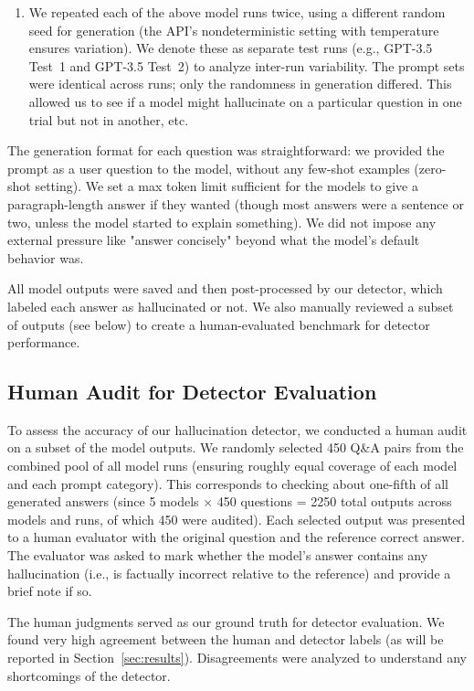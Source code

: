 \documentclass{article}
\begin{document}
\begin{enumerate}
    \item We repeated each of the above model runs twice, using a different random seed for generation (the API's nondeterministic setting with temperature ensures variation). We denote these as separate test runs (e.g., GPT-3.5 Test~1 and GPT-3.5 Test~2) to analyze inter-run variability. The prompt sets were identical across runs; only the randomness in generation differed. This allowed us to see if a model might hallucinate on a particular question in one trial but not in another, etc.
\end{enumerate}

The generation format for each question was straightforward: we provided the prompt as a user question to the model, without any few-shot examples (zero-shot setting). We set a max token limit sufficient for the models to give a paragraph-length answer if they wanted (though most answers were a sentence or two, unless the model started to explain something). We did not impose any external pressure like "answer concisely" beyond what the model's default behavior was.

All model outputs were saved and then post-processed by our detector, which labeled each answer as hallucinated or not. We also manually reviewed a subset of outputs (see below) to create a human-evaluated benchmark for detector performance.

\subsection{Human Audit for Detector Evaluation}
To assess the accuracy of our hallucination detector, we conducted a human audit on a subset of the model outputs. We randomly selected 450 Q\&A pairs from the combined pool of all model runs (ensuring roughly equal coverage of each model and each prompt category). This corresponds to checking about one-fifth of all generated answers (since 5 models $\times$ 450 questions = 2250 total outputs across models and runs, of which 450 were audited). Each selected output was presented to a human evaluator with the original question and the reference correct answer. The evaluator was asked to mark whether the model's answer contains any hallucination (i.e., is factually incorrect relative to the reference) and provide a brief note if so.

The human judgments served as our ground truth for detector evaluation. We found very high agreement between the human and detector labels (as will be reported in Section~\ref{sec:results}). Disagreements were analyzed to understand any shortcomings of the detector.
\end{document}
